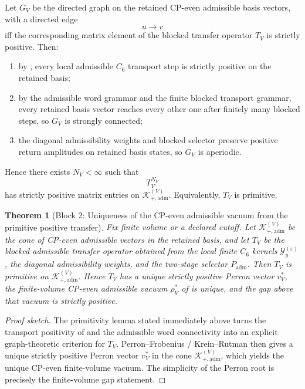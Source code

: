 \documentclass[11pt,a4paper]{article}
\newtheorem{theorem}{Theorem}[section]
\theoremstyle{definition}
\theoremstyle{remark}
\newcommand{\Padm}{P_{\mathrm{adm}}}
\begin{document}
\begin{tcolorbox}[colback=tfptblue!2, colframe=tfptblue!40, breakable,
    title={Primitivity lemma underlying Block 2}, colbacktitle=tfptblue!60]
Let $G_V$ be the directed graph on the retained CP-even admissible basis vectors, with a directed
edge
\[
u\to v
\]
iff the corresponding matrix element of the blocked transfer operator $T_V$ is strictly positive.
Then:
\begin{enumerate}[label=(\roman*), leftmargin=1.5em, topsep=3pt, itemsep=2pt]
    \item by , every local admissible $C_6$ transport step is
    strictly positive on the retained basis;
    \item by the admissible word grammar and the finite blocked transport grammar, every retained
    basis vector reaches every other one after finitely many blocked steps, so $G_V$ is strongly
    connected;
    \item the diagonal admissibility weights and blocked selector preserve positive return
    amplitudes on retained basis states, so $G_V$ is aperiodic.
\end{enumerate}
Hence there exists $N_V<\infty$ such that
\[
T_V^{N_V}
\]
has strictly positive matrix entries on $\mathcal K_{+,\mathrm{adm}}^{(V)}$. Equivalently, $T_V$
is primitive.
\end{tcolorbox}

\begin{theorem}[Block 2: Uniqueness of the CP-even admissible vacuum from the primitive positive transfer]
\label{thm:cp-even-vacuum-uniqueness}
Fix finite volume or a declared cutoff. Let $\mathcal K_{+,\mathrm{adm}}^{(V)}$ be the cone of
CP-even admissible vectors in the retained basis, and let $T_V$ be the blocked admissible
transfer operator obtained from the local finite $C_6$ kernels
$\mathcal Y_y^{(\varepsilon)}$, the diagonal admissibility weights, and the two-stage selector
$\Padm$. Then $T_V$ is primitive on $\mathcal K_{+,\mathrm{adm}}^{(V)}$. Hence $T_V$ has a unique
strictly positive Perron vector $v_V^\ast$, the finite-volume CP-even admissible vacuum
$\rho^\ast_V$ of  is unique, and the gap above that
vacuum is strictly positive.
\end{theorem}

\begin{proof}[Proof sketch]
The primitivity lemma stated immediately above turns the transport positivity of
 and the admissible word connectivity into an explicit
graph-theoretic criterion for $T_V$. Perron--Frobenius / Krein--Rutman then gives a unique
strictly positive Perron vector $v_V^\ast$ in the cone
$\mathcal K_{+,\mathrm{adm}}^{(V)}$, which yields the unique CP-even finite-volume vacuum. The
simplicity of the Perron root is precisely the finite-volume gap statement.
\end{proof}
\end{document}

